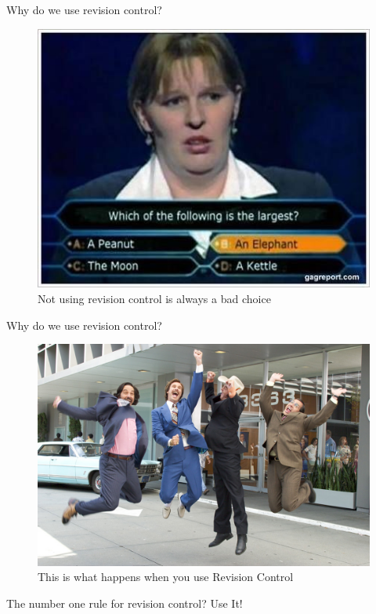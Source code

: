 \begin{frame}{Why do we use revision control?}
    \begin{figure}[ht]
        \centering
        \includegraphics[width=0.8\linewidth]{img/losing.jpg}
        \caption{Not using revision control is always a bad choice}
        \label{fig:figure2}
    \end{figure}
\end{frame}

\begin{frame}{Why do we use revision control?}
    \begin{figure}[ht]
        \centering
        \includegraphics[width=0.8\linewidth]{img/winning.jpg}
        \caption{This is what happens when you use Revision Control}
        \label{fig:figure1}
    \end{figure}
\end{frame}

\begin{frame}{The number one rule for revision control?}
Use It! 
\end{frame}
